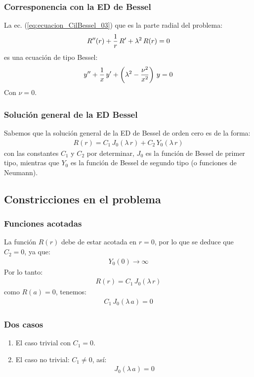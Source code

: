 \documentclass[12pt]{beamer}
\begin{document}
\begin{frame}
\frametitle{Corresponencia con la ED de Bessel}
La ec. (\ref{eq:ecuacion_CilBessel_03}) que es la parte radial del problema:
\begin{align*}
{R}^{\prime \prime}(r) + \dfrac{1}{r} \, {R}^{\prime} + \lambda^{2} \, R(r) = 0
\end{align*}
\pause
es una ecuación de tipo Bessel:
\pause
\begin{align*}
{y}^{\prime \prime} + \dfrac{1}{x} \, {y}^{\prime} + \left( \lambda^{2} - \dfrac{\nu^{2}}{x^{2}} \right) \, y = 0
\end{align*}
\pause
Con $\nu = 0$.
\end{frame}
\begin{frame}
\frametitle{Solución general de la ED Bessel}
Sabemos que la solución general de la ED de Bessel de orden cero es de la forma:
\pause
\begin{align*}
R(r) = C_{1} \, J_{0} (\lambda \, r) + C_{2} \, Y_{0} (\lambda \, r)
\end{align*}
con las constantes $C_{1}$ y $C_{2}$ por determinar, $J_{0}$ es la función de Bessel de primer tipo, mientras que $Y_{0}$ es la función de Bessel de segundo tipo (o funciones de Neumann).
\end{frame}

\subsection{Constricciones en el problema}

\begin{frame}
\frametitle{Funciones acotadas}
La función $R(r)$ debe de estar acotada en $r = 0$, \pause por lo que se deduce que $C_{2} = 0$, ya que:
\pause
\begin{align*}
Y_{0}(0) \to \infty
\end{align*}
\pause
Por lo tanto:
\begin{align*}
R(r) = C_{1} \, J_{0}(\lambda \, r)
\end{align*}
\pause
como $R(a) = 0$, tenemos:
\begin{align*}
C_{1} \, J_{0} (\lambda \, a) = 0
\end{align*}
\end{frame}
\begin{frame}
\frametitle{Dos casos}
\begin{enumerate}[<+->]
\item El caso trivial con $C_{1} = 0$.
\item El caso no trivial: $C_{1} \neq 0$, así:
\pause
\begin{align}
J_{0} (\lambda \, a) = 0
\label{eq:ecuacion_CilBessel_05}
\end{align}
\end{enumerate}
\end{frame}
\end{document}
